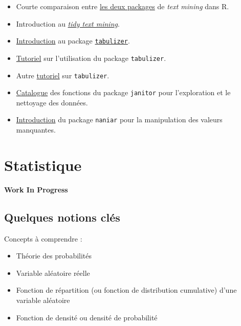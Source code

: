 \documentclass[
  french,
]{book}
\providecommand{\tightlist}{%
  \setlength{\itemsep}{0pt}\setlength{\parskip}{0pt}}
\newenvironment{infobox}[1]
  {
  \begin{itemize}
  \renewcommand{\labelitemi}{
    \raisebox{-.7\height}[0pt][0pt]{
      {\setkeys{Gin}{width=3em,keepaspectratio}
        \texttt{[image: images/\#1]}}
    }
  }
  \setlength{\fboxsep}{1em}
  \begin{blackbox}
  \item
  }
  {
  \end{blackbox}
  \end{itemize}
  }
\begin{document}
\begin{itemize}
\tightlist
\item
  Courte comparaison entre \href{https://thinkr.fr/tm-ou-tidytext-introduction-au-text-mining-avec-r/}{les deux
  packages}
  de \emph{text mining} dans R.
\item
  Introduction au \href{https://www.tidytextmining.com/}{\emph{tidy text mining}}.
\item
  \href{https://cran.r-project.org/web/packages/tabulizer/vignettes/tabulizer.html}{Introduction} au package \href{https://github.com/ropensci/tabulizer}{\texttt{tabulizer}}.
\item
  \href{https://datascienceplus.com/extracting-tables-from-pdfs-in-r-using-the-tabulizer-package/}{Tutoriel}
  sur l'utilisation du package \texttt{tabulizer}.
\item
  Autre \href{https://blog.az.sg/posts/reading-pdfs-in-r/}{tutoriel} sur \texttt{tabulizer}.
\item
  \href{https://cran.r-project.org/web/packages/janitor/vignettes/janitor.html}{Catalogue}
  des fonctions du package \texttt{janitor} pour l'exploration et le nettoyage des données.
\item
  \href{https://cran.r-project.org/web/packages/naniar/vignettes/getting-started-w-naniar.html}{Introduction}
  du package \texttt{naniar} pour la manipulation des valeurs manquantes.
\end{itemize}

\hypertarget{statistique}{%
\chapter{Statistique}\label{statistique}}

\begin{infobox}{caution}

\textbf{Work In Progress}

\end{infobox}

\hypertarget{quelques-notions-cluxe9s}{%
\section{Quelques notions clés}\label{quelques-notions-cluxe9s}}

Concepts à comprendre :

\begin{itemize}
\tightlist
\item
  Théorie des probabilités
\item
  Variable aléatoire réelle
\item
  Fonction de répartition (ou fonction de distribution cumulative) d'une
  variable aléatoire
\item
  Fonction de densité ou densité de probabilité
\end{itemize}
\end{document}
